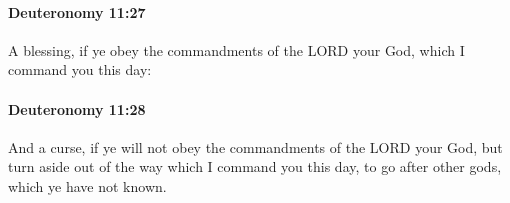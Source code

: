 		\paragraph{Deuteronomy 11:27} %
			\label{DEUTERONOMY-11-27}

			A blessing, if ye obey the commandments of the LORD your God, which I command you this day:


		\paragraph{Deuteronomy 11:28} %
			\label{DEUTERONOMY-11-28}

			And a curse, if ye will not obey the commandments of the LORD your God, but turn aside out of the way which I command you this day, to go after other gods, which ye have not known.


